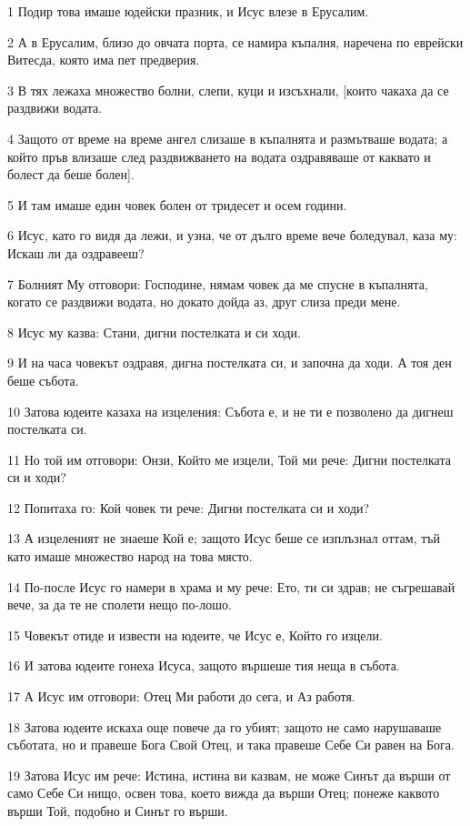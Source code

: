 \par 1 Подир това имаше юдейски празник, и Исус влезе в Ерусалим.
\par 2 А в Ерусалим, близо до овчата порта, се намира къпалня, наречена по еврейски Витесда, която има пет предверия.
\par 3 В тях лежаха множество болни, слепи, куци и изсъхнали, [които чакаха да се раздвижи водата.
\par 4 Защото от време на време ангел слизаше в къпалнята и размътваше водата; а който пръв влизаше след раздвижването на водата оздравяваше от каквато и болест да беше болен].
\par 5 И там имаше един човек болен от тридесет и осем години.
\par 6 Исус, като го видя да лежи, и узна, че от дълго време вече боледувал, каза му: Искаш ли да оздравееш?
\par 7 Болният Му отговори: Господине, нямам човек да ме спусне в къпалнята, когато се раздвижи водата, но докато дойда аз, друг слиза преди мене.
\par 8 Исус му казва: Стани, дигни постелката и си ходи.
\par 9 И на часа човекът оздравя, дигна постелката си, и започна да ходи. А тоя ден беше събота.
\par 10 Затова юдеите казаха на изцеления: Събота е, и не ти е позволено да дигнеш постелката си.
\par 11 Но той им отговори: Онзи, Който ме изцели, Той ми рече: Дигни постелката си и ходи?
\par 12 Попитаха го: Кой човек ти рече: Дигни постелката си и ходи?
\par 13 А изцеленият не знаеше Кой е; защото Исус беше се изплъзнал оттам, тъй като имаше множество народ на това място.
\par 14 По-после Исус го намери в храма и му рече: Ето, ти си здрав; не съгрешавай вече, за да те не сполети нещо по-лошо.
\par 15 Човекът отиде и извести на юдеите, че Исус е, Който го изцели.
\par 16 И затова юдеите гонеха Исуса, защото вършеше тия неща в събота.
\par 17 А Исус им отговори: Отец Ми работи до сега, и Аз работя.
\par 18 Затова юдеите искаха още повече да го убият; защото не само нарушаваше съботата, но и правеше Бога Свой Отец, и така правеше Себе Си равен на Бога.
\par 19 Затова Исус им рече: Истина, истина ви казвам, не може Синът да върши от само Себе Си нищо, освен това, което вижда да върши Отец; понеже каквото върши Той, подобно и Синът го върши.
